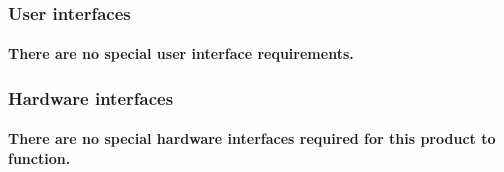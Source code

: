 \subsubsection{User interfaces}
\paragraph{There are no special user interface requirements.}

\subsubsection{Hardware interfaces}
\paragraph{There are no special hardware interfaces required for this product to function.}

